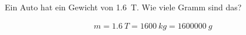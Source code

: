 
\begin{aufgabe}
	Ein Auto hat ein Gewicht von \SI{1.6}{T}. Wie viele Gramm sind das?
	\begin{loesung}
		\begin{eqnarray*}
			m=\SI{1.6}{T}=\SI{1600}{kg}=\SI{1600000}{g}
		\end{eqnarray*}
	\end{loesung}
\end{aufgabe}
